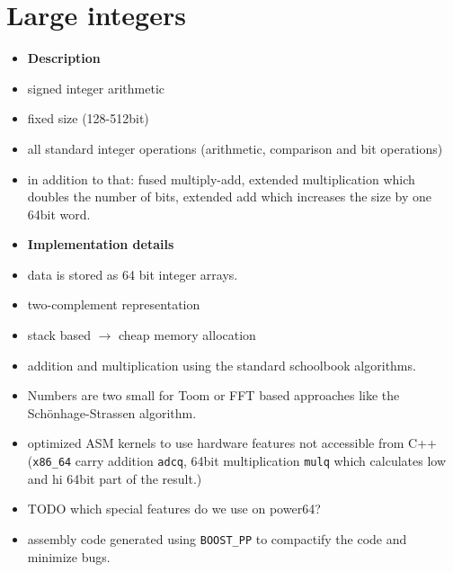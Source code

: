 \documentclass[oribibl]{llncs2e/llncs}
\begin{document}

\section{Large integers}
\begin{itemize}
\item {\bf Description}
\item signed integer arithmetic
\item fixed size (128-512bit)
\item all standard integer operations (arithmetic, comparison and bit operations)
\item in addition to that: fused multiply-add, extended multiplication which doubles the number of bits, extended add which increases the size by one 64bit word.
\item {\bf Implementation details}
\item data is stored as 64 bit integer arrays.
\item two-complement representation
\item stack based $\rightarrow$ cheap memory allocation
\item addition and multiplication using the standard schoolbook algorithms.
\item Numbers are two small for Toom\cite{Toom} or FFT based approaches like the Sch\"onhage-Strassen algorithm\cite{Schonhage}.
\item optimized ASM kernels to use hardware features not accessible from C++ (\verb|x86_64| carry addition \verb|adcq|, 64bit multiplication \verb|mulq| which calculates low and hi 64bit part of the result.)
\item TODO which special features do we use on power64?
\item assembly code generated using \verb|BOOST_PP| to compactify the code and minimize bugs.
\end{itemize}
\end{document}
